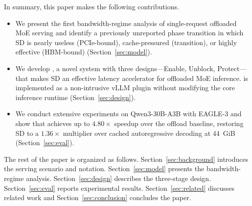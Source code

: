 In summary, this paper makes the following contributions.
\begin{itemize}[leftmargin=1.2em]
\item We present the first bandwidth-regime analysis of single-request offloaded MoE serving and identify a previously unreported phase transition in which SD is nearly useless (PCIe-bound), cache-pressured (transition), or highly effective (HBM-bound) (Section~\ref{sec:model}).
\item We develop \sysname, a novel system with three designs---Enable, Unblock, Protect---that makes SD an effective latency accelerator for offloaded MoE inference. \sysname is implemented as a non-intrusive vLLM plugin without modifying the core inference runtime (Section~\ref{sec:design}).
\item We conduct extensive experiments on Qwen3-30B-A3B with EAGLE-3 and show that \sysname achieves up to $4.80\times$ speedup over the offload baseline, restoring SD to a $1.36\times$ multiplier over cached autoregressive decoding at 44~GiB (Section~\ref{sec:eval}).
\end{itemize}

The rest of the paper is organized as follows. Section~\ref{sec:background} introduces the serving scenario and notation. Section~\ref{sec:model} presents the bandwidth-regime analysis. Section~\ref{sec:design} describes the three-stage \sysname design. Section~\ref{sec:eval} reports experimental results. Section~\ref{sec:related} discusses related work and Section~\ref{sec:conclusion} concludes the paper.